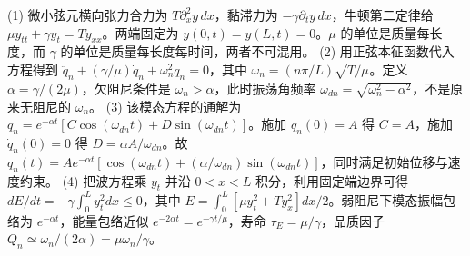 (1) 微小弦元横向张力合力为 \(T\partial_x^2y\,dx\)，黏滞力为 \(-\gamma\partial_ty\,dx\)，牛顿第二定律给 \(\mu y_{tt}+\gamma y_t=Ty_{xx}\)。两端固定为 \(y(0,t)=y(L,t)=0\)。\(\mu\) 的单位是质量每长度，而 \(\gamma\) 的单位是质量每长度每时间，两者不可混用。
(2) 用正弦本征函数代入方程得到 \(\ddot q_n+(\gamma/\mu)\dot q_n+\omega_n^2q_n=0\)，其中 \(\omega_n=(n\pi/L)\sqrt{T/\mu}\)。定义 \(\alpha=\gamma/(2\mu)\)，欠阻尼条件是 \(\omega_n>\alpha\)，此时振荡角频率 \(\omega_{dn}=\sqrt{\omega_n^2-\alpha^2}\)，不是原来无阻尼的 \(\omega_n\)。
(3) 该模态方程的通解为 \(q_n=e^{-\alpha t}[C\cos(\omega_{dn}t)+D\sin(\omega_{dn}t)]\)。施加 \(q_n(0)=A\) 得 \(C=A\)，施加 \(\dot q_n(0)=0\) 得 \(D=\alpha A/\omega_{dn}\)。故 \(q_n(t)=Ae^{-\alpha t}[\cos(\omega_{dn}t)+(\alpha/\omega_{dn})\sin(\omega_{dn}t)]\)，同时满足初始位移与速度约束。
(4) 把波方程乘 \(y_t\) 并沿 \(0<x<L\) 积分，利用固定端边界可得 \(dE/dt=-\gamma\int_0^Ly_t^2dx\le0\)，其中 \(E=\int_0^L[\mu y_t^2+Ty_x^2]dx/2\)。弱阻尼下模态振幅包络为 \(e^{-\alpha t}\)，能量包络近似 \(e^{-2\alpha t}=e^{-\gamma t/\mu}\)，寿命 \(\tau_E=\mu/\gamma\)，品质因子 \(Q_n\simeq\omega_n/(2\alpha)=\mu\omega_n/\gamma\)。
